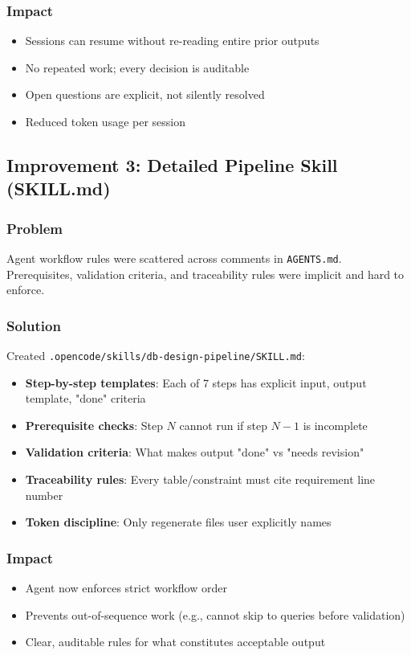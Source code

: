 \documentclass[12pt,a4paper]{article}
\begin{document}
\subsubsection{Impact}
\begin{itemize}
    \item Sessions can resume without re-reading entire prior outputs
    \item No repeated work; every decision is auditable
    \item Open questions are explicit, not silently resolved
    \item Reduced token usage per session
\end{itemize}

\subsection{Improvement 3: Detailed Pipeline Skill (SKILL.md)}

\subsubsection{Problem}
Agent workflow rules were scattered across comments in \texttt{AGENTS.md}. Prerequisites, validation criteria, and traceability rules were implicit and hard to enforce.

\subsubsection{Solution}
Created \texttt{.opencode/skills/db-design-pipeline/SKILL.md}:

\begin{itemize}
    \item \textbf{Step-by-step templates}: Each of 7 steps has explicit input, output template, "done" criteria
    \item \textbf{Prerequisite checks}: Step $N$ cannot run if step $N-1$ is incomplete
    \item \textbf{Validation criteria}: What makes output "done" vs "needs revision"
    \item \textbf{Traceability rules}: Every table/constraint must cite requirement line number
    \item \textbf{Token discipline}: Only regenerate files user explicitly names
\end{itemize}

\subsubsection{Impact}
\begin{itemize}
    \item Agent now enforces strict workflow order
    \item Prevents out-of-sequence work (e.g., cannot skip to queries before validation)
    \item Clear, auditable rules for what constitutes acceptable output
\end{itemize}
\end{document}

